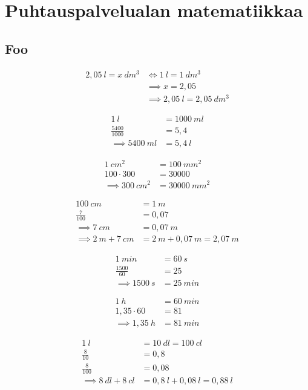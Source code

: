 


\part{Puhtauspalvelualan matematiikkaa}

\chapter{Foo}

\begin{align*}
2,05\ l = x\ dm^3  &\Leftrightarrow 1\ l = 1\ dm^3 \\
&\implies x = 2,05 \\
&\implies  2,05\ l = 2,05\ dm^3
\end{align*}


\begin{align*}
1\ l &= 1000\ ml \\
\frac{5400}{1000} &= 5,4 \\
\implies 5400\ ml &= 5,4\ l
\end{align*}



\begin{align*}
1\ cm^2 &= 100\ mm^2 \\
100 \cdot 300 &= 30000 \\
\implies 300\ cm^2 &= 30000\ mm^2
\end{align*}


\begin{align*}
100\ cm &= 1\ m \\
\frac{7}{100} &= 0,07 \\
\implies 7\ cm &= 0,07\ m \\
\implies 2\ m + 7\ cm &= 2\ m + 0,07\ m = 2,07\ m
\end{align*}


\begin{align*}
1\ min &= 60\ s \\
\frac{1500}{60} &= 25 \\
\implies 1500\ s &= 25\ min
\end{align*}


\begin{align*}
1\ h &= 60\ min \\
1,35 \cdot 60 &= 81 \\
\implies 1,35\ h &= 81\ min
\end{align*}


\begin{align*}
1\ l &= 10\ dl = 100\ cl \\
\frac{8}{10} &= 0,8 \\
\frac{8}{100} &= 0,08 \\
\implies 8\ dl + 8\ cl &= 0,8\ l + 0,08\ l = 0,88\ l
\end{align*}


